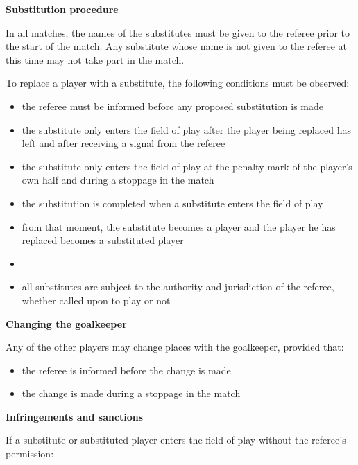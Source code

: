 {\bfseries Substitution procedure}

\headlinebox

In all matches, the names of the substitutes must be given to the referee prior to the start of the match. Any substitute whose name is not given to the referee at this time may not take part in the match.

\bigskip

To replace a player with a substitute, the following conditions must be observed:

\begin{itemize}
\item the referee must be informed before any proposed substitution is made
\item the substitute only enters the field of play after the player being replaced has left and after receiving a signal from the referee
\item the substitute only enters the field of play at the penalty mark of the player's own half  and during a stoppage in the match 
\item the substitution is completed when a substitute enters the field of play
\item from that moment, the substitute becomes a player and the player he has replaced becomes a substituted player 
\item {}
\item all substitutes are subject to the authority and jurisdiction of the referee, whether called upon to play or not
\end{itemize}

{\bfseries Changing the goalkeeper}

\headlinebox

Any of the other players may change places with the goalkeeper, provided that:

\begin{itemize}
\item the referee is informed before the change is made
\item the change is made during a stoppage in the match
\end{itemize}

{\bfseries Infringements and sanctions}

\headlinebox

If a substitute or substituted player  enters the field of play without the referee's permission:

